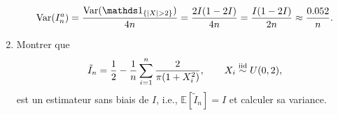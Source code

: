 \documentclass[11pt]{td_um}
\begin{document}
\begin{exo}{}
\begin{enumerate}
{\begin{equation*}
                    \mbox{Var}(I_n^a) =  \frac{\mbox{Var}(\one_{\{|X| >
                    2\}})}{4n} = \frac{2 I (1 - 2 I)}{4 n} = \frac{I (1
                    - 2 I)}{2 n} \approx \frac{0.052}{n}.
                \end{equation*}
            }
        \item Montrer que
            \begin{equation*}
                \tilde{I}_n = \frac{1}{2} - \frac{1}{n} \sum_{i=1}^n
                \frac{2}{\pi (1 + X_i^2)}, \qquad X_i \stackrel{\rm iid}{\sim}
                U(0,2),
            \end{equation*}
            est un estimateur sans biais de $I$, i.e., $\mathbb{E}[\tilde{I}_n] = I$ et calculer sa variance.
\end{enumerate}
\end{exo}
\end{document}
